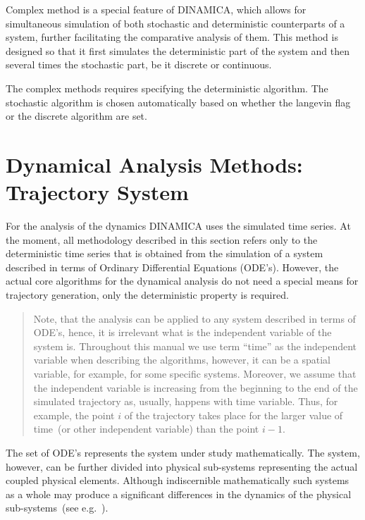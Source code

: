 \documentclass[11pt,a4paper]{article}
\begin{document}
Complex method is a special feature of DINAMICA, which allows for simultaneous
simulation of both stochastic and deterministic counterparts of a system, further
facilitating the comparative analysis of them. This method is designed so that it
first simulates the deterministic part of the system and then several times the
stochastic part, be it discrete or continuous.

The complex methods requires specifying the deterministic algorithm. The stochastic
algorithm is chosen automatically based on whether the langevin flag or the discrete
algorithm are set.

\section[Trajectory System]{Dynamical Analysis Methods: \\Trajectory System}
\label{sec:dynam-analys-meth}

For the analysis of the dynamics DINAMICA uses the simulated time series. At the
moment, all methodology described in this section refers only to the deterministic
time series that is obtained from the simulation of a system described in terms of
Ordinary Differential Equations (ODE's). However, the actual core algorithms for the
dynamical analysis do not need a special means for trajectory generation, only the
deterministic property is required.

\begin{quotation}
Note, that the analysis can be applied to any system described in terms of ODE's,
hence, it is irrelevant what is the independent variable of the system is. Throughout
this manual we use term ``time'' as the independent variable when describing the
algorithms, however, it can be a spatial variable, for example, for some specific
systems. Moreover, we assume that the independent variable is increasing from the
beginning to the end of the simulated trajectory as, usually, happens with time
variable. Thus, for example, the point $i$ of the trajectory takes place for the
larger value of time~(or other independent variable) than the point $i-1$.
\end{quotation}

The set of ODE's represents the system under study mathematically. The system,
however, can be further divided into physical sub-systems representing the actual
coupled physical elements. Although indiscernible mathematically such systems as a
whole may produce a significant differences in the dynamics of the physical
sub-systems~(see e.g.~\cite{Ullner2008}).
\end{document}
